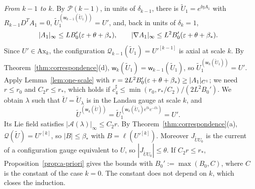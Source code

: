 \emph{From $k-1$ to $k$.} By $\mathcal P(k-1)$, in units of $\delta_{k-1}$, there is $\tilde U_1=e^{\ii\eta A_1}$ with $R_{k-1}D^TA_1=0$, $\tilde U_1^{(\mathsf w_{k-1}(\tilde U_1))}=U'$, and, back in units of $\delta_k=1$,
\[
|A_1|_\infty\le LB_0'(\varepsilon+\theta+\beta_*),\qquad|\nabla A_1|_\infty\le L^2B_0'(\varepsilon+\theta+\beta_*).
\]
Since $U'\in\mathrm{Ax}_k$, the configuration $\mathcal Q_{k-1}(\tilde U_1)=U'^{[k-1]}$ is axial at scale $k$. By Theorem~\ref{thm:correspondence}(d), $\mathsf w_k(\tilde U_1)=\mathsf w_{k-1}(\tilde U_1)$, so $\tilde U_1^{(\mathsf w_k(\tilde U_1))}=U'$. Apply Lemma~\ref{lem:one-scale} with $r=2L^2B_0'(\varepsilon+\theta+\beta_*)\ge|A_1|_{C^1}$; we need $r\le r_0$ and $C_2r\le r_*$, which holds if $c_4^\sharp\le\min(r_0,r_*/C_2)/(2L^2B_0')$. We obtain $\lambda$ such that $\tilde U=\tilde U_\lambda$ is in the Landau gauge at scale $k$, and
\[
\tilde U^{(\mathsf w_k(\tilde U))}=\tilde U_1^{(\mathsf w_k(\tilde U_1)e^{\ii\lambda}e^{-\ii\lambda})}=U' .
\]
Its Lie field satisfies $|\mathcal A(\lambda)|_\infty\le C_2r$. By Theorem~\ref{thm:correspondence}(a), $\mathcal Q(\tilde U)=U'^{[k]}$, so $|B|\le\beta_*$ with $B=\ell(U'^{[k]})$. Moreover $J_{\tilde UU_0}$ is the current of a configuration gauge equivalent to $U$, so $|J_{\tilde UU_0}|\le\theta$. If $C_2r\le r_*$, Proposition~\ref{prop:a-priori} gives the bounds with $B_0':=\max(B_0,C)$, where $C$ is the constant of the case $k=0$. The constant does not depend on $k$, which closes the induction.

